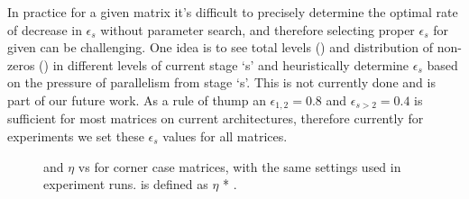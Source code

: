 In practice for a given matrix it's difficult to precisely determine the optimal rate of decrease in $\epsilon_s$ without parameter search, and therefore selecting proper $\epsilon_s$ for given \nthreads can be challenging. One idea is to see total levels (\totalLvl) and distribution of non-zeros (\nnz) in different levels of current stage `s' and heuristically determine $\epsilon_s$ based on the pressure of parallelism from stage `s'. This is not currently done and is part of our future work. As a rule of thump an $\epsilon_{1,2} = 0.8$ and $\epsilon_{s>2} = 0.4$ is sufficient for most matrices on current architectures, therefore currently for experiments we set these $\epsilon_s$ values for all matrices.

\begin{figure}[tbhp]
	\centering
	\caption{\threadEff and $\eta$ vs \nthreads for corner case matrices, with the same settings used in experiment runs. \threadEff is defined as $\eta$ * \nthreads.}
	\label{fig:corner_cases_param}
\end{figure}

